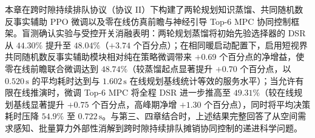 本章在跨时隙持续排队协议（协议 II）下构建了两轮规划知识蒸馏、共同随机数反事实辅助 PPO 微调以及零在线仿真前瞻与神经引导 Top-6 MPC 协同控制框架。盲测确认实验与受控开关消融表明：两轮规划蒸馏将初始先验选择器的 DSR 从 $44.30\%$ 提升至 $48.04\%$（$+3.74$ 个百分点）；在相同暖启动配置下，启用短视界共同随机数反事实辅助模块相对纯在策略微调带来 $+0.69$ 个百分点的净增益，使零在线前瞻联合微调达到 $48.74\%$（较蒸馏起点显著提升 $+0.70$ 个百分点，以 $0.520\,\mathrm{s}$ 的平均耗时达到与 $1.602\,\mathrm{s}$ 在线规划基线统计等效的服务水平）；当允许有限在线推演时，微调 Top-6 MPC 将全程 DSR 进一步推高至 $49.31\%$（较在线规划基线显著提升 $+0.75$ 个百分点，高峰期净增 $+1.30$ 个百分点），同时将平均决策耗时压降 $54.9\%$ 至 $0.722\,\mathrm{s}$。与第三、四章结合时，上述结果完整回答了从空间需求感知、批量算力外部性消解到跨时隙持续排队摊销协同控制的递进科学问题。
